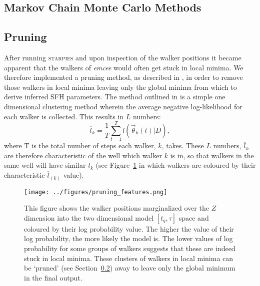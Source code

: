 \documentclass[useAMS,usenatbib]{mn2e}
\begin{document}
\subsection{Markov Chain Monte Carlo Methods}\label{sec:emcee}


\subsection{Pruning}\label{sec:pruning}

After running \textsc{starpies} and upon inspection of the walker positions it became apparent that the walkers of \emph{emcee} would often get stuck in local minima. We therefore implemented a pruning method, as described in \cite{hou12}, in order to remove those walkers in local minima leaving only the global minima from which to derive inferred SFH parameters. The method outlined in \cite{hou12} is a simple one dimensional clustering method wherein the average negative log-likelihood for each walker is collected. This results in $L$ numbers:
\begin{equation}
\overline{l}_k = \frac{1}{T} \sum^{T}_{t=1} l(\vec{\theta}_k(t)|D),
\end{equation}
where T is the total number of steps each walker, $k$, takes. These $L$ numbers, $\overline{l}_k$ are therefore characteristic of the well which walker $k$ is in, so that walkers in the same well will have similar $\overline{l}_k$ (see Figure~\ref{fig:localminima} in which walkers are coloured by their characteristic $\overline{l}_{(k)}$ value). 


\begin{figure}
\centering
\texttt{[image: ../figures/pruning\_features.png]}
\caption{This figure shows the walker positions marginalized over the $Z$ dimension into the two dimensional model $[t_q, \tau]$ space and coloured by their log probability value. The higher the value of their log probability, the more likely the model is. The lower values of log probability for some groups of walkers suggests that these are indeed stuck in local minima. These clusters of walkers in local minima can be `pruned' (see Section~\ref{sec:pruning}) away to leave only the global minimum in the final output.}
\label{fig:localminima}
\end{figure}
\end{document}
